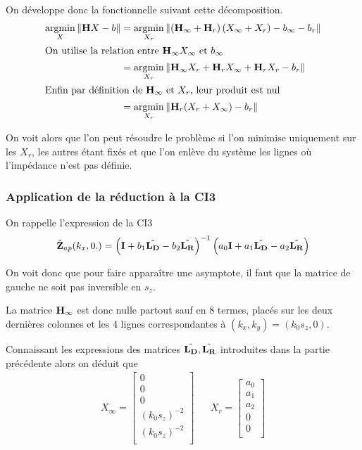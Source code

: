 On développe donc la fonctionnelle suivant cette décomposition.
\begin{align*}
{\underset{X}{\operatorname{argmin}}}\left\rVert {\mathbf{H}} X - {b} \right \rVert &= {\underset{X_r}{\operatorname{argmin}}}\left\rVert \left({\mathbf{H}}_\infty + {\mathbf{H}}_r\right)\left( X_\infty + X_r \right) - {b}_\infty - {b}_r \right \rVert
\\
\intertext{On utilise la relation entre \({\mathbf{H}}_\infty X_\infty\) et \({b}_\infty\)}
&=  {\underset{X_r}{\operatorname{argmin}}}\left\rVert {\mathbf{H}}_\infty X_r + {\mathbf{H}}_r X_\infty + {\mathbf{H}}_r X_r - {b}_r \right \rVert
\\
\intertext{Enfin par définition de \({\mathbf{H}}_\infty\) et \(X_r\), leur produit est nul}
&= {\underset{X_r}{\operatorname{argmin}}} \left\rVert {\mathbf{H}}_r ( X_r + X_\infty)- {b}_r \right \rVert
\end{align*}

On voit alors que l'on peut résoudre le problème si l'on minimise uniquement sur les \(X_r\), les autres étant fixés et que l'on enlève du système les lignes où l'impédance n'est pas définie.

\subsubsection{Application de la réduction à la CI3}

On rappelle l'expression de la CI3
\begin{equation*}
  \hat{\mathbf{Z}}_{ap}(k_x,0.) = \left(\mathbf{I} + b_1 \hat{\mathbf{L_D}} - b_2 \hat{\mathbf{L_R}} \right)^{-1}\left(a_0\mathbf{I} + a_1 \hat{\mathbf{L_D}} - a_2 \hat{\mathbf{L_R}} \right)
\end{equation*}

On voit donc que pour faire apparaître une asymptote, il faut que la matrice de gauche ne soit pas inversible en \(s_z\).

La matrice \({\mathbf{H}}_\infty\) est donc nulle partout sauf en 8 termes, placés sur les deux dernières colonnes et les 4 lignes correspondantes à \((k_x,k_y)=(k_0 s_z,0)\).

Connaissant les expressions des matrices \(\hat{\mathbf{L_D}},\hat{\mathbf{L_R}}\) introduites dans la partie précédente alors on déduit que
\begin{align*}
  X_\infty = \begin{bmatrix}
    0\\
    0\\
    0\\
    (k_0 s_z)^{-2}\\
    (k_0 s_z)^{-2}\\
  \end{bmatrix}
  & &
  X_r = \begin{bmatrix}
  a_0\\
  a_1\\
  a_2\\
  0\\
  0\\
  \end{bmatrix}
\end{align*}

